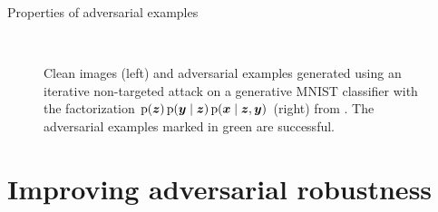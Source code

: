 \documentclass{beamer}
\newcommand{\citet}[1]{{\color{citecolor}\relscale{0.8}\textcite{#1}}}
\begin{document}
\begin{frame}[allowframebreaks=0.9]{Properties of adversarial examples}
	\begin{figure}
		\begin{center}
			\
		\end{center}
		\caption{Clean images (left) and adversarial examples generated using an iterative non-targeted attack on a generative MNIST classifier with the factorization $\operatorname{\mathrm{p}}(\boldsymbol{z})\operatorname{\mathrm{p}}(\boldsymbol{y}\mid\boldsymbol{z})\operatorname{\mathrm{p}}(\boldsymbol{x}\mid\boldsymbol{z},\boldsymbol{y})$ (right) from \citet{Li:2019:AGCMRAA}. The adversarial examples marked in green are successful.}
		\label{fig:li-gfz-adversarial-examples-mnist}
	\end{figure}
\end{frame}

\section{Improving adversarial robustness}
\end{document}
